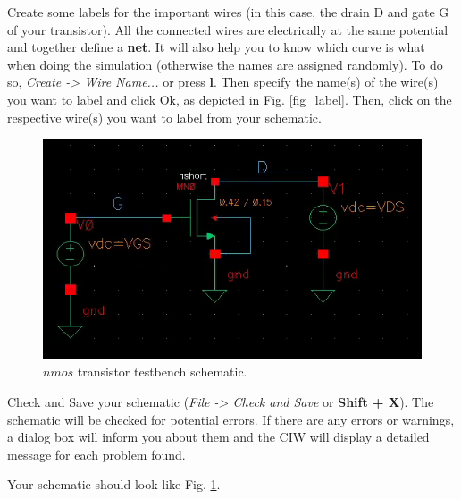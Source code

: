 \begin{enumerate}
{		\item Create some labels for the important wires (in this case, the drain D and gate G of your transistor). All the connected wires are electrically at the same potential and together define a \textbf{net}. It will also help you to know which curve is what when doing the simulation (otherwise the names are assigned randomly). To do so, \textit{Create -> Wire Name...} or press \textbf{l}. Then specify the name(s) of the wire(s) you want to label and click Ok, as depicted in Fig. \ref{fig_label}. Then, click on the respective wire(s) you want to label from your schematic.\newline } 
	
	\parbox[t]{\dimexpr\textwidth-\leftmargin}{%
		\begin{figure}
			\vspace{-0mm}
			\centering
			\vspace{-\baselineskip}
			\includegraphics[scale=0.6]{figures/lab1_schematic_sim/nmos_carac}
			\caption{$nmos$ transistor testbench schematic.}
			\label{fig_nmos_carac}
		\end{figure}
		\item Check and Save your schematic (\textit{File -> Check and Save} or \textbf{Shift + X}). The schematic will be checked for potential errors. If there are any errors or warnings, a dialog box will inform you about them and the CIW will display a detailed message for each problem found.
		\item Your schematic should look like Fig. \ref{fig_nmos_carac}.\newline } 
	
	
\end{enumerate}
\newpage
